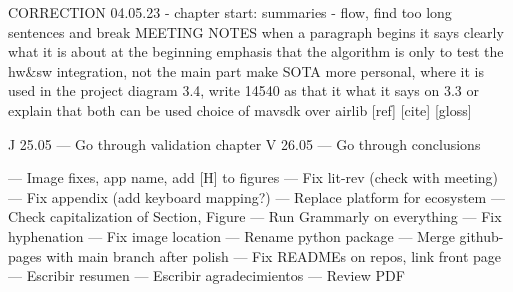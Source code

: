 CORRECTION 04.05.23
 - chapter start: summaries
 - flow, find too long sentences and break
 MEETING NOTES
when a paragraph begins it says clearly what it is about at the beginning
emphasis that the algorithm is only to test the hw&sw integration, not the main part
make SOTA more personal, where it is used in the project
diagram 3.4, write 14540 as that it what it says on 3.3 or explain that both can be used
choice of mavsdk over airlib
[ref] [cite] [gloss]


 

J 25.05 --- Go through validation chapter
V 26.05 --- Go through conclusions

        --- Image fixes, app name, add [H] to figures
        --- Fix lit-rev (check with meeting)
        --- Fix appendix (add keyboard mapping?)
        --- Replace platform for ecosystem
        --- Check capitalization of Section, Figure
        --- Run Grammarly on everything
        --- Fix hyphenation
        --- Fix image location
        --- Rename python package
        --- Merge github-pages with main branch after polish
        --- Fix READMEs on repos, link front page
        --- Escribir resumen
        --- Escribir agradecimientos
        --- Review PDF